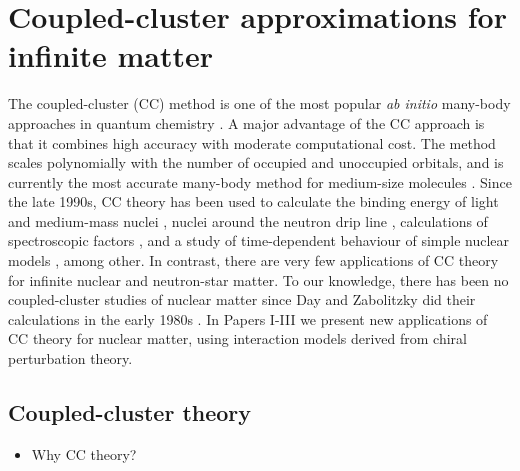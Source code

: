 \documentclass[a4paper,12pt]{report}
\begin{document}
\chapter{Coupled-cluster approximations for infinite matter} \label{ch:cc}

The coupled-cluster (CC) method is one of the most popular \emph{ab initio}
many-body approaches in quantum chemistry \cite{bartlett_review}. 
A major advantage of the CC approach is that it combines high accuracy 
with moderate computational cost. The method scales polynomially 
with the number of occupied and unoccupied orbitals, and is currently the 
most accurate many-body method for medium-size molecules 
\cite{bartlett_review}. Since the late 1990s, CC theory has been used 
to calculate the binding energy of light and 
medium-mass nuclei \cite{dean2004,heisenberg1999,hagen2007_1,
hagen2007_2,roth2009}, nuclei around the neutron drip line 
\cite{hagen2012,hagen2013}, calculations of spectroscopic 
factors \cite{jensen2010}, and a study of time-dependent behaviour 
of simple nuclear models \cite{pigg2012}, among other. In contrast, 
there are very few applications of CC theory for infinite 
nuclear and neutron-star matter. To our knowledge, there has been
no coupled-cluster studies of nuclear matter since Day and Zabolitzky 
did their calculations in the early 1980s \cite{day_cc}. In 
Papers I-III we present new applications 
of CC theory for nuclear matter, using interaction models derived
from chiral perturbation theory.


\section{Coupled-cluster theory} \label{sec:cct}

\begin{itemize}
\item Why CC theory?
\end{itemize}
\end{document}
